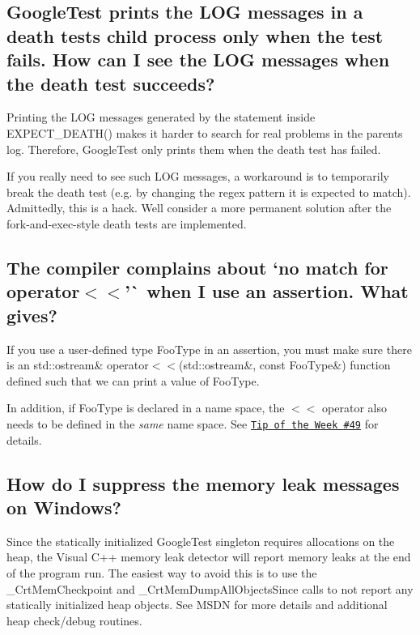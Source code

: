 \subsection*{Google\+Test prints the L\+OG messages in a death test\textquotesingle{}s child process only when the test fails. How can I see the L\+OG messages when the death test succeeds?}

Printing the L\+OG messages generated by the statement inside {\ttfamily E\+X\+P\+E\+C\+T\+\_\+\+D\+E\+A\+T\+H()} makes it harder to search for real problems in the parent\textquotesingle{}s log. Therefore, Google\+Test only prints them when the death test has failed.

If you really need to see such L\+OG messages, a workaround is to temporarily break the death test (e.\+g. by changing the regex pattern it is expected to match). Admittedly, this is a hack. We\textquotesingle{}ll consider a more permanent solution after the fork-\/and-\/exec-\/style death tests are implemented.

\subsection*{The compiler complains about `no match for \textquotesingle{}operator$<$$<$'\`{} when I use an assertion. What gives?}

If you use a user-\/defined type {\ttfamily Foo\+Type} in an assertion, you must make sure there is an {\ttfamily std\+::ostream\& operator$<$$<$(std\+::ostream\&, const Foo\+Type\&)} function defined such that we can print a value of {\ttfamily Foo\+Type}.

In addition, if {\ttfamily Foo\+Type} is declared in a name space, the {\ttfamily $<$$<$} operator also needs to be defined in the {\itshape same} name space. See \href{https://abseil.io/tips/49}{\tt Tip of the Week \#49} for details.

\subsection*{How do I suppress the memory leak messages on Windows?}

Since the statically initialized Google\+Test singleton requires allocations on the heap, the Visual C++ memory leak detector will report memory leaks at the end of the program run. The easiest way to avoid this is to use the {\ttfamily \+\_\+\+Crt\+Mem\+Checkpoint} and {\ttfamily \+\_\+\+Crt\+Mem\+Dump\+All\+Objects\+Since} calls to not report any statically initialized heap objects. See M\+S\+DN for more details and additional heap check/debug routines.

